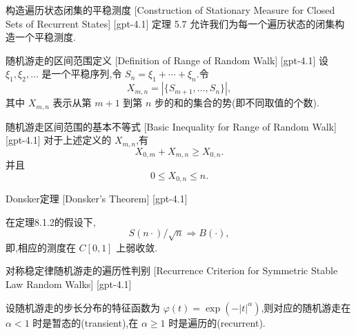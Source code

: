 \documentclass[UTF8]{ctexart}
\begin{document}
    
    
    \begin{thm}
        {构造遍历状态闭集的平稳测度}
        [Construction of Stationary Measure for Closed Sets of Recurrent States]
        [gpt-4.1]
        定理 5.7 允许我们为每一个遍历状态的闭集构造一个平稳测度.
    \end{thm}
    
    
    
    \begin{dfn}
        {随机游走的区间范围定义}
        [Definition of Range of Random Walk]
        [gpt-4.1]
        设 $\xi_{1}, \xi_{2}, \ldots$ 是一个平稳序列,令 $S_{n} = \xi_{1} + \cdots + \xi_{n}$.令
\[
X_{m, n} = | \{ S_{m+1}, \ldots, S_{n} \} |,
\]
其中 $X_{m, n}$ 表示从第 $m+1$ 到第 $n$ 步的和的集合的势(即不同取值的个数).

    \end{dfn}
    
    
    
    \begin{ppt}
        {随机游走区间范围的基本不等式}
        [Basic Inequality for Range of Random Walk]
        [gpt-4.1]
        对于上述定义的 $X_{m, n}$,有
\[
X_{0, m} + X_{m, n} \geq X_{0, n}.
\]
并且
\[
0 \leq X_{0, n} \leq n.
\]

    \end{ppt}
    
    
    
    \begin{thm}
        {Donsker定理}
        [Donsker's Theorem]
        [gpt-4.1]
        
在定理8.1.2的假设下,
\[
S(n\cdot)/\sqrt{n} \Rightarrow B(\cdot),
\]
即,相应的测度在 $C[0, 1]$ 上弱收敛.

    \end{thm}
    
    
    
    \begin{thm}
        {对称稳定律随机游走的遍历性判别}
        [Recurrence Criterion for Symmetric Stable Law Random Walks]
        [gpt-4.1]
        
设随机游走的步长分布的特征函数为 $\varphi(t) = \exp(-|t|^{\alpha})$,则对应的随机游走在 $\alpha < 1$ 时是暂态的(transient),在 $\alpha \geq 1$ 时是遍历的(recurrent).

    \end{thm}
    
\end{document}
